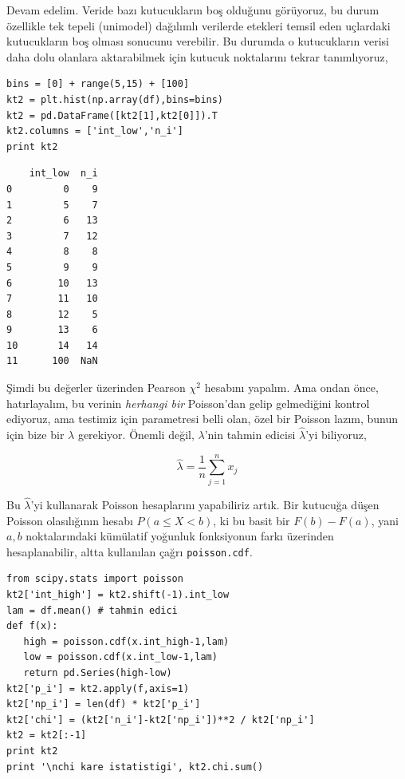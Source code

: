 \documentclass[12pt,fleqn]{article}\usepackage{../../common}
\begin{document}
Devam edelim. Veride bazı kutucukların boş olduğunu görüyoruz, bu durum
özellikle tek tepeli (unimodel) dağılımlı verilerde etekleri temsil eden
uçlardaki kutucukların boş olması sonucunu verebilir. Bu durumda o kutucukların
verisi daha dolu olanlara aktarabilmek için kutucuk noktalarını tekrar
tanımlıyoruz,

\begin{verbatim}
bins = [0] + range(5,15) + [100]
kt2 = plt.hist(np.array(df),bins=bins)
kt2 = pd.DataFrame([kt2[1],kt2[0]]).T
kt2.columns = ['int_low','n_i']
print kt2
\end{verbatim}

\begin{verbatim}
    int_low  n_i
0         0    9
1         5    7
2         6   13
3         7   12
4         8    8
5         9    9
6        10   13
7        11   10
8        12    5
9        13    6
10       14   14
11      100  NaN
\end{verbatim}

Şimdi bu değerler üzerinden Pearson $\chi^2$ hesabını yapalım. Ama ondan
önce, hatırlayalım, bu verinin {\em herhangi bir} Poisson'dan gelip
gelmediğini kontrol ediyoruz, ama testimiz için parametresi belli olan,
özel bir Poisson lazım, bunun için bize bir $\lambda$ gerekiyor. Önemli
değil, $\lambda$'nin tahmin edicisi $\hat{\lambda}$'yi biliyoruz,

$$ \hat{\lambda} = \frac{1}{n} \sum _{j=1}^{n}x_j $$

Bu $\hat{\lambda}$'yi kullanarak Poisson hesaplarını yapabiliriz artık. Bir
kutucuğa düşen Poisson olasılığının hesabı $P(a \le X < b)$, ki bu basit
bir $F(b)-F(a)$, yani $a,b$ noktalarındaki kümülatif yoğunluk fonksiyonun
farkı üzerinden hesaplanabilir, altta kullanılan çağrı \verb!poisson.cdf!.

\begin{verbatim}
from scipy.stats import poisson
kt2['int_high'] = kt2.shift(-1).int_low
lam = df.mean() # tahmin edici
def f(x): 
   high = poisson.cdf(x.int_high-1,lam)
   low = poisson.cdf(x.int_low-1,lam)
   return pd.Series(high-low)
kt2['p_i'] = kt2.apply(f,axis=1)
kt2['np_i'] = len(df) * kt2['p_i']
kt2['chi'] = (kt2['n_i']-kt2['np_i'])**2 / kt2['np_i']
kt2 = kt2[:-1]
print kt2
print '\nchi kare istatistigi', kt2.chi.sum()
\end{verbatim}
\end{document}
